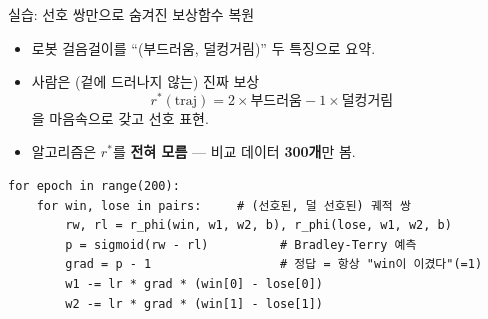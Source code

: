 \documentclass[aspectratio=169,11pt]{beamer}
\begin{document}

\begin{frame}[fragile]{실습: 선호 쌍만으로 숨겨진 보상함수 복원}
  \begin{itemize}
    \item 로봇 걸음걸이를 ``(부드러움, 덜컹거림)'' 두 특징으로 요약.
    \item 사람은 (겉에 드러나지 않는) 진짜 보상
      \[r^*(\text{traj})=2\times\text{부드러움}-1\times\text{덜컹거림}\]
      을 마음속으로 갖고 선호 표현.
    \item 알고리즘은 $r^*$를 \textbf{전혀 모름} — 비교 데이터
      \textbf{300개}만 봄.
\end{itemize}
\begin{lstlisting}
for epoch in range(200):
    for win, lose in pairs:     # (선호된, 덜 선호된) 궤적 쌍
        rw, rl = r_phi(win, w1, w2, b), r_phi(lose, w1, w2, b)
        p = sigmoid(rw - rl)          # Bradley-Terry 예측
        grad = p - 1                  # 정답 = 항상 "win이 이겼다"(=1)
        w1 -= lr * grad * (win[0] - lose[0])
        w2 -= lr * grad * (win[1] - lose[1])
\end{lstlisting}
\end{frame}
\end{document}
